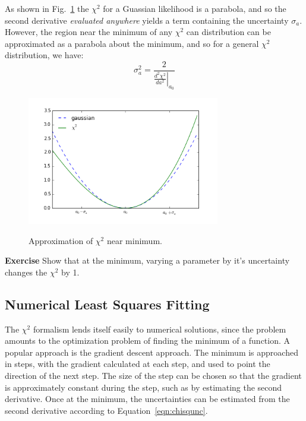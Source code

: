 \documentclass[12pt]{article}
\begin{document}
As shown in Fig.~\ref{fig:chisq} the $\chi^2$ for a Guassian likelihood is a parabola, and so the second derivative {\em evaluated anywhere} yields a term containing the uncertainty $\sigma_a$.  However, the region near the minimum of any $\chi^2$ can distribution can be approximated as a parabola about the minimum, and so for a general $\chi^2$ distribution, we have:
\begin{equation} \label{eqn:chisqunc}
\sigma_a^2  = \frac{2}{\left. \frac{d^2\chi^2}{da^2} \right|_{a_0}}
\end{equation}

\begin{figure}[htbp]
\begin{center}
{\includegraphics[width=0.75\textwidth]{figs/chisq.png}}
\end{center}
\caption{\label{fig:chisq} Approximation of $\chi^2$ near minimum.}
\end{figure}

{\bf Exercise} Show that at the minimum, varying a parameter by it's uncertainty changes the $\chi^2$ by 1.

\subsection{Numerical Least Squares Fitting}

The $\chi^2$ formalism lends itself easily to numerical solutions, since the problem amounts to the optimization problem of finding the minimum of a function.  A popular approach is the gradient descent approach.  The minimum is approached in steps, with the gradient calculated at each step, and used to point the direction of the next step.  The size of the step can be chosen so that the gradient is approximately constant during the step, such as by estimating the second derivative.  Once at the minimum, the uncertainties can be estimated from the second derivative according to Equation~\ref{eqn:chisqunc}.
\end{document}
